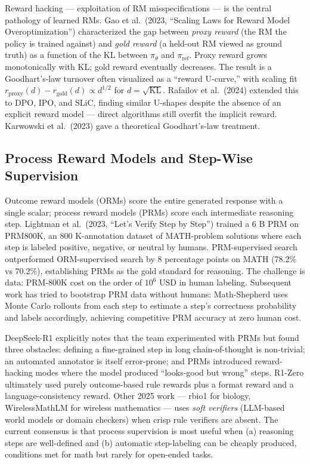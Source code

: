 \documentclass{article}
\begin{document}
Reward hacking --- exploitation of RM misspecifications --- is the central pathology of learned RMs. Gao et al.~(2023, ``Scaling Laws for Reward Model Overoptimization'') characterized the gap between \emph{proxy reward} (the RM the policy is trained against) and \emph{gold reward} (a held-out RM viewed as ground truth) as a function of the KL between \(\pi_\theta\) and \(\pi_{\text{ref}}\). Proxy reward grows monotonically with KL; gold reward eventually decreases. The result is a Goodhart's-law turnover often visualized as a ``reward U-curve,'' with scaling fit \(r_{\text{proxy}}(d) - r_{\text{gold}}(d) \propto d^{1/2}\) for \(d = \sqrt{\mathrm{KL}}\). Rafailov et al.~(2024) extended this to DPO, IPO, and SLiC, finding similar U-shapes despite the absence of an explicit reward model --- direct algorithms still overfit the implicit reward. Karwowski et al.~(2023) gave a theoretical Goodhart's-law treatment.

\subsection{Process Reward Models and Step-Wise Supervision}\label{process-reward-models-and-step-wise-supervision}

Outcome reward models (ORMs) score the entire generated response with a single scalar; process reward models (PRMs) score each intermediate reasoning step. Lightman et al.~(2023, ``Let's Verify Step by Step'') trained a 6 B PRM on PRM800K, an 800 K-annotation dataset of MATH-problem solutions where each step is labeled positive, negative, or neutral by humans. PRM-supervised search outperformed ORM-supervised search by 8 percentage points on MATH (78.2\% vs 70.2\%), establishing PRMs as the gold standard for reasoning. The challenge is data: PRM-800K cost on the order of \(10^6\) USD in human labeling. Subsequent work has tried to bootstrap PRM data without humans: Math-Shepherd \citep{wang2024interpretableprefe} uses Monte Carlo rollouts from each step to estimate a step's correctness probability and labels accordingly, achieving competitive PRM accuracy at zero human cost.

DeepSeek-R1 \citep{guo20252025} explicitly notes that the team experimented with PRMs but found three obstacles: defining a fine-grained step in long chain-of-thought is non-trivial; an automated annotator is itself error-prone; and PRMs introduced reward-hacking modes where the model produced ``looks-good but wrong'' steps. R1-Zero ultimately used purely outcome-based rule rewards plus a format reward and a language-consistency reward. Other 2025 work --- rbio1 \citep{istrate20252025} for biology, WirelessMathLM \citep{li20252025} for wireless mathematics --- uses \emph{soft verifiers} (LLM-based world models or domain checkers) when crisp rule verifiers are absent. The current consensus is that process supervision is most useful when (a) reasoning steps are well-defined and (b) automatic step-labeling can be cheaply produced, conditions met for math but rarely for open-ended tasks.
\end{document}
